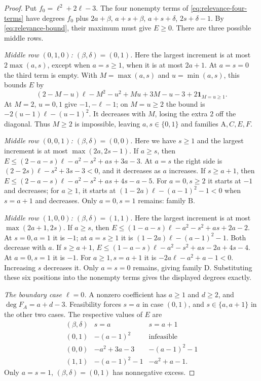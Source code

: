 \documentclass[a4paper,11pt]{amsart}
\numberwithin{equation}{subsection}
\theoremstyle{plain}
\theoremstyle{definition}
\theoremstyle{remark}
\begin{document}
\begin{proof}
Put $f_0=\ell^2+2\ell-3$. The four nonempty terms of
\autoref{eq:relevance-four-terms} have degrees $f_0$ plus
$2a+\beta$, $a+s+\beta$, $a+s+\delta$,
$2s+\delta-1$.
By \autoref{eq:relevance-bound}, their maximum must give $E\ge0$.
There are three possible middle rows.

\textit{Middle row $(0,1,0)$: $(\beta,\delta)=(0,1)$.} Here the largest increment is at most
$2\max(a,s)$, except when $a=s\ge1$, when it is at most $2a+1$.
At $a=s=0$ the third term is empty.  With $M=\max(a,s)$ and
$u=\min(a,s)$, this bounds $E$ by
\[
(2-M-u)\ell-M^2-u^2+Mu+3M-u-3
+2\mathbf1_{M=u\ge1}.
\]
At $M=2$, $u=0,1$ give $-1,-\ell-1$; on $M=u\ge2$ the bound
is $-2(u-1)\ell-(u-1)^2$. It decreases with $M$, losing the extra
$2$ off the diagonal. Thus $M\ge2$ is impossible, leaving
$a,s\in\{0,1\}$ and families $\mathrm A,C,E,F$.

\textit{Middle row $(0,0,1)$: $(\beta,\delta)=(0,0)$.} Here we have $s\ge1$ and the largest
increment is at most $\max(2a,2s-1)$.  If $a\ge s$, then
$E\le(2-a-s)\ell-a^2-s^2+as+3a-3$.
At $a=s$ the right side is $(2-2s)\ell-s^2+3s-3<0$, and it decreases
as $a$ increases.  If $s\ge a+1$, then
$E\le(2-a-s)\ell-a^2-s^2+as+4s-a-5$.
For $a=0,s\ge2$ it starts at $-1$ and decreases; for $a\ge1$,
it starts at $(1-2a)\ell-(a-1)^2-1<0$ when $s=a+1$ and decreases.
Only $a=0,s=1$ remains: family $\mathrm B$.

\textit{Middle row $(1,0,0)$: $(\beta,\delta)=(1,1)$.} Here the largest increment is at most
$\max(2a+1,2s)$.  If $a\ge s$, then
$E\le(1-a-s)\ell-a^2-s^2+as+2a-2$.
At $s=0,a=1$ it is $-1$; at $a=s\ge1$ it is
$(1-2a)\ell-(a-1)^2-1$. Both decrease with $a$. If $s\ge a+1$,
$E\le(1-a-s)\ell-a^2-s^2+as-2a+4s-4$.
At $a=0,s=1$ it is $-1$.  For $a\ge1,s=a+1$ it is
$-2a\ell-a^2+a-1<0$.  Increasing $s$ decreases it.  Only $a=s=0$
remains, giving family $\mathrm D$.  Substituting these six positions
into the nonempty terms gives the displayed degrees exactly.

\textit{The boundary case $\ell=0$.} A nonzero coefficient has $a\ge1$ and $d\ge2$, and
$\deg F_A=a+d-3$.  Feasibility forces $s=a$ in case $(0,1)$,
and $s\in\{a,a+1\}$ in the other two cases.  The respective values
of $E$ are
\[
\begin{array}{c|cc}
(\beta,\delta)&s=a&s=a+1\\\hline
(0,1)&-(a-1)^2&\text{infeasible}\\
(0,0)&-a^2+3a-3&-(a-1)^2-1\\
(1,1)&-(a-1)^2-1&-a^2+a-1.
\end{array}
\]
Only $a=s=1$, $(\beta,\delta)=(0,1)$ has nonnegative excess.


\end{proof}
\end{document}
